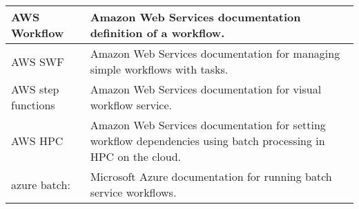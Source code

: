 \begin{table*}[htb]
{{\begin{tabular}{|p{3cm}p{12cm}|}
AWS Workflow \cite{www-aws-workflow} & Amazon Web Services documentation definition of a workflow.\\
\hline

AWS SWF \cite{www-aws-swf} & Amazon Web Services documentation for managing simple workflows with tasks. \\
\hline

AWS step functions \cite{www-aws-stepfunctions} & Amazon Web Services documentation for visual workflow service. \\
\hline

AWS HPC  \cite{www-aws-batch-workflow} & Amazon Web Services documentation for setting workflow dependencies using batch processing in HPC on the cloud. \\
\hline

azure batch: \cite{www-azure-batch} & Microsoft Azure documentation for running batch service workflows. \\
\hline

\end{tabular}
}
}
\end{table*}
